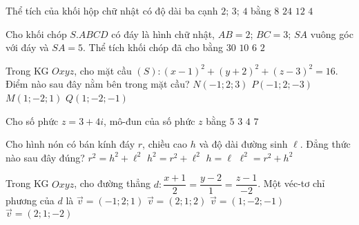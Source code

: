 \begin{ex}%
	Thể tích của khối hộp chữ nhật có độ dài ba cạnh $2$; $3$; $4$ bằng
	\choice
	{$8$}
	{\True $24$}
	{$12$}
	{$4$}
\end{ex}

\begin{ex}%
	Cho khối chóp $S.ABCD$ có đáy là hình chữ nhật, $AB=2$; $BC=3$; $SA$ vuông góc với đáy và $SA=5$. Thể tích khối chóp đã cho bằng
	\choice
	{$30$}
	{\True $10$}
	{$6$}
	{$2$}
\end{ex}

\begin{ex}%
	Trong KG $Oxyz$, cho mặt cầu $(S) \colon (x-1)^2+(y+2)^2+(z-3)^2=16$. Điểm nào sau đây nằm bên trong mặt cầu?
	\choice
	{$N(-1;2;3)$}
	{$P(-1;2;-3)$}
	{\True $M(1;-2;1)$}
	{$Q(1;-2;-1)$}
\end{ex}

\begin{ex}%
	Cho số phức $z=3+4i$, mô-đun của số phức $z$ bằng
	\choice
	{\True $5$}
	{$3$}
	{$4$}
	{$7$}
\end{ex}

\begin{ex}%
	Cho hình nón có bán kính đáy $r$, chiều cao $h$ và độ dài đường sinh $\ell$. Đẳng thức nào sau đây đúng?
	\choice
	{$r^2=h^2+\ell^2$}
	{$h^2=r^2+\ell^2$}
	{$h=\ell$}
	{\True $\ell^2=r^2+h^2$}
\end{ex}

\begin{ex}%
	Trong KG $Oxyz$, cho đường thẳng $d \colon \dfrac{x+1}{2}=\dfrac{y-2}{1}=\dfrac{z-1}{-2}$. Một véc-tơ chỉ phương của $d$ là
	\choice
	{$\overrightarrow{v}=(-1;2;1)$}
	{$\overrightarrow{v}=(2;1;2)$}
	{$\overrightarrow{v}=(1;-2;-1)$}
	{\True $\overrightarrow{v}=(2;1;-2)$}
\end{ex}

